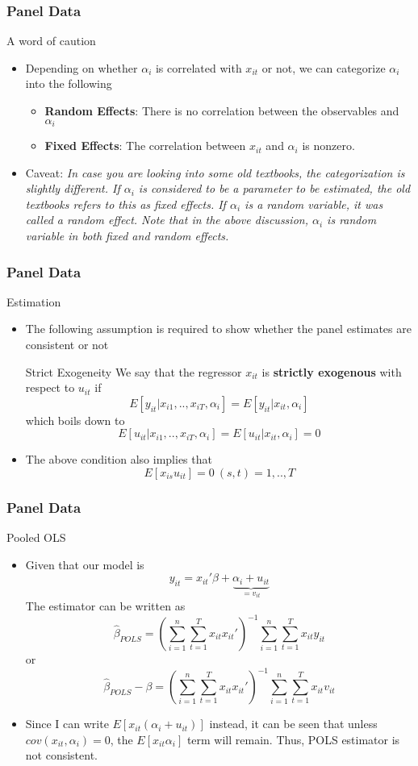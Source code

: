\documentclass{beamer}
\begin{document}
\begin{frame}
\frametitle{Panel Data}
A word of caution
\begin{itemize}
\item Depending on whether $\alpha_i$ is correlated with $x_{it}$ or not, we can categorize $\alpha_i$ into the following
\begin{itemize}
\item \textbf{Random Effects}: There is no correlation between the observables and $\alpha_i$
\item \textbf{Fixed Effects}: The correlation between $x_{it}$ and $\alpha_i$ is nonzero. 
\end{itemize}
\item Caveat: \textit{In case you are looking into some old textbooks, the categorization is slightly different. If $\alpha_i$ is considered to be a parameter to be estimated, the old textbooks refers to this as fixed effects. If $\alpha_i$ is a random variable, it was called a random effect. Note that in the above discussion, $\alpha_i$ is random variable in both fixed and random effects.}
\end{itemize}
\end{frame}

\begin{frame}
\frametitle{Panel Data}
Estimation 
\begin{itemize}
\item The following assumption is required to show whether the panel estimates are consistent or not
\begin{block}{Strict Exogeneity}
We say that the regressor $x_{it}$ is \textbf{strictly exogenous} with respect to $u_{it}$ if
\[
E[y_{it}|x_{i1},..,x_{iT},\alpha_i]=E[y_{it}|x_{it},\alpha_i]
\]
which boils down to
\[
E[u_{it}|x_{i1},..,x_{iT},\alpha_i]=E[u_{it}|x_{it},\alpha_i]=0
\]
\end{block}
\item The above condition also implies that 
\[
E[x_{is}u_{it}]=0 \ (s,t)=1,..,T
\]
\end{itemize}
\end{frame}

\begin{frame}
\frametitle{Panel Data}
Pooled OLS
\begin{itemize}
\item Given that our model is
\small{\[
y_{it}= x_{it}'\beta+\underbrace{\alpha_i+u_{it}}_{=v_{it}}
\]}\normalsize
The estimator can be written as
\small{\[
\hat{\beta}_{POLS}=\left(\sum_{i=1}^n\sum_{t=1}^T x_{it}x_{it}'\right)^{-1}\sum_{i=1}^n\sum_{t=1}^T x_{it}y_{it}
\]}\normalsize
or
\footnotesize{\[
\hat{\beta}_{POLS}-\beta = \left(\sum_{i=1}^n\sum_{t=1}^T x_{it}x_{it}'\right)^{-1}\sum_{i=1}^n\sum_{t=1}^T x_{it}v_{it}
\]}\normalsize
\item  Since I can write $E[x_{it}(\alpha_i+u_{it})]$ instead, it can be seen that unless $cov(x_{it},\alpha_i)=0$, the $E[x_{it}\alpha_i]$ term will remain. Thus, POLS estimator is not consistent.
\end{itemize}
\end{frame}
\end{document}
